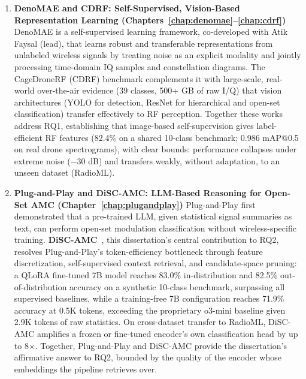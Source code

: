 \begin{enumerate}
    \item \textbf{DenoMAE and CDRF: Self-Supervised, Vision-Based Representation Learning (Chapters~\ref{chap:denomae}--\ref{chap:cdrf})}
    DenoMAE is a self-supervised learning framework, co-developed with Atik Faysal (lead), that learns robust and transferable representations from unlabeled wireless signals by treating noise as an explicit modality and jointly processing time-domain IQ samples and constellation diagrams. The CageDroneRF (CDRF) benchmark complements it with large-scale, real-world over-the-air evidence (39 classes, 500+ GB of raw I/Q) that vision architectures (YOLO for detection, ResNet for hierarchical and open-set classification) transfer effectively to RF perception. Together these works address RQ1, establishing that image-based self-supervision gives label-efficient RF features (82.4\% on a shared 10-class benchmark; 0.986 mAP@0.5 on real drone spectrograms), with clear bounds: performance collapses under extreme noise ($-30$ dB) and transfers weakly, without adaptation, to an unseen dataset (RadioML).

    \item \textbf{Plug-and-Play and DiSC-AMC: LLM-Based Reasoning for Open-Set AMC (Chapter~\ref{chap:plugandplay})}
    Plug-and-Play first demonstrated that a pre-trained LLM, given statistical signal summaries as text, can perform open-set modulation classification without wireless-specific training. \textbf{DiSC-AMC}~\cite{disc_amc}, this dissertation's central contribution to RQ2, resolves Plug-and-Play's token-efficiency bottleneck through feature discretization, self-supervised context retrieval, and candidate-space pruning: a QLoRA fine-tuned 7B model reaches 83.0\% in-distribution and 82.5\% out-of-distribution accuracy on a synthetic 10-class benchmark, surpassing all supervised baselines, while a training-free 7B configuration reaches 71.9\% accuracy at 0.5K tokens, exceeding the proprietary o3-mini baseline given 2.9K tokens of raw statistics. On cross-dataset transfer to RadioML, DiSC-AMC amplifies a frozen or fine-tuned encoder's own classification head by up to 8$\times$. Together, Plug-and-Play and DiSC-AMC provide the dissertation's affirmative answer to RQ2, bounded by the quality of the encoder whose embeddings the pipeline retrieves over.


\end{enumerate}
